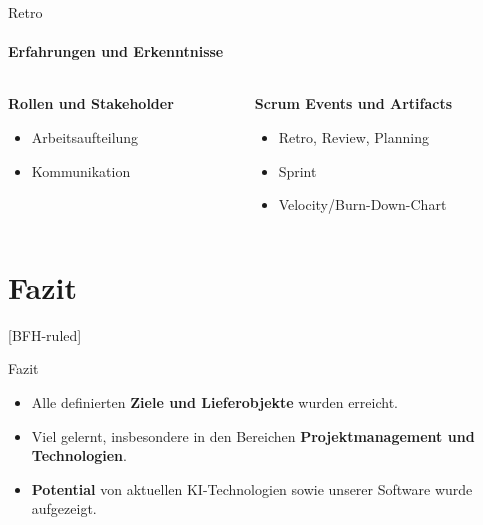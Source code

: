 \documentclass[
    ngerman,%
    authorontitle=true,
]{bfhbeamer}
\begin{document}
    \begin{frame}{Retro}
        \framesubtitle{Erfahrungen und Erkenntnisse}
        \begin{center}
            \begin{columns}[t]
                \begin{column}{0.3\textwidth}
                    \textbf{Rollen und Stakeholder}
                    \begin{itemize}
                        \item Arbeitsaufteilung
                        \item Kommunikation
                    \end{itemize}
                \end{column}


                \begin{column}{0.4\textwidth}
                    \textbf{Scrum Events und Artifacts}
                    \begin{itemize}
                        \item Retro, Review, Planning
                        \item Sprint
                        \item Velocity/Burn-Down-Chart
                    \end{itemize}
                \end{column}

            \end{columns}
        \end{center}
    \end{frame}


    \section{Fazit}\label{sec:fazit}
    [BFH-ruled]
    \frame{\sectionpage}

    \begin{frame}{Fazit}
        \begin{itemize}
            \item Alle definierten \textbf{Ziele und Lieferobjekte} wurden erreicht.
            \item Viel gelernt, insbesondere in den Bereichen \textbf{Projektmanagement und Technologien}.
            \item \textbf{Potential} von aktuellen KI-Technologien sowie unserer Software wurde aufgezeigt.
        \end{itemize}
    \end{frame}
\end{document}
